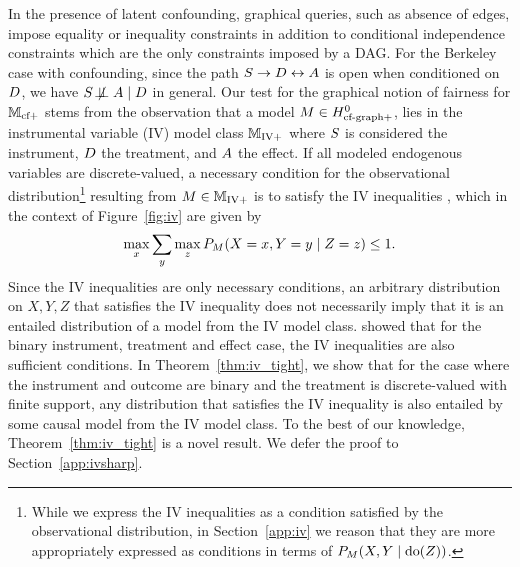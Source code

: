 In the presence of latent confounding, graphical queries, such as absence of edges, impose equality or inequality constraints \citep{Evans16, WolfeSF19} in addition to conditional independence constraints which are the only constraints imposed by a DAG. For the Berkeley case with confounding, since the path $S \rightarrow D \leftrightarrow A$ is open when conditioned on $D$, we have $S \not\!\perp\!\!\!\perp A \mid D$ in general. 
Our test for the graphical notion of fairness for $\mathbb{M}_{\text{cf}+}$ stems from the observation that a model $M \in H^0_{\text{cf-graph}+}$, lies in the instrumental variable (IV) model class $\mathbb{M}_{\text{IV}+}$ where $S$ is considered the instrument, $D$ the treatment, and $A$ the effect. If all modeled endogenous variables are discrete-valued, a necessary condition for the observational distribution\footnote{While we express the IV inequalities as a condition satisfied by the observational distribution, in Section~\ref{app:iv} we reason that they are more appropriately expressed as conditions in terms of $P_{M}(X,Y \mid \text{do}(Z))$.} resulting from $M \in \mathbb{M}_{\text{IV}+}$ is to satisfy the IV inequalities \citep{Pearl95}, which in the context of Figure~\ref{fig:iv} are given by  
\begin{equation}\label{eq:iv}
    \max_{x} \sum_{y} \max_{z} P_{M}{\left({X=x,Y=y\mid Z=z}\right)} \leq 1. 
\end{equation}
Since the IV inequalities are only necessary conditions, an arbitrary distribution on $X,Y,Z$ that satisfies the IV inequality does not necessarily imply that it is an entailed distribution of a model from the IV model class. \citet{Bonet01} showed that for the binary instrument, treatment and effect case, the IV inequalities are also sufficient conditions. In Theorem~\ref{thm:iv_tight}, we show that for the case where the instrument and outcome are binary and the treatment is discrete-valued with finite support, any distribution that satisfies the IV inequality is also entailed by some causal model from the IV model class. To the best of our knowledge, Theorem~\ref{thm:iv_tight} is a novel result. We defer the proof to Section~\ref{app:ivsharp}.
